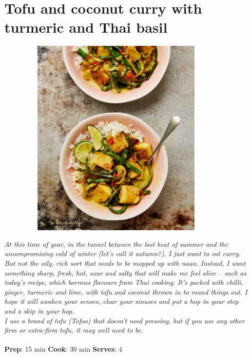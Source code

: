 \documentclass{book}
\begin{document}
\section{Tofu and coconut curry with turmeric and Thai basil}
\begin{figure}
\centering\includegraphics[width=10cm,height=10cm,keepaspectratio]{Recipe_Pictures/Tofu_and_coconut_curry_with_turmeric_and_Thai_basil.png}
\end{figure}
\emph{At this time of year, in the tunnel between the last heat of summer and the uncompromising cold of winter (let’s call it autumn?), I just want to eat curry. But not the oily, rich sort that needs to be mopped up with naan. Instead, I want something sharp, fresh, hot, sour and salty that will make me feel alive – such as today’s recipe, which borrows flavours from Thai cooking. It’s packed with chilli, ginger, turmeric and lime, with tofu and coconut thrown in to round things out. I hope it will awaken your senses, clear your sinuses and put a hop in your step and a skip in your hop.\\ 
I use a brand of tofu (Tofoo) that doesn’t need pressing, but if you use any other firm or extra-firm tofu, it may well need to be.}\\\\ 
\textbf{Prep}: 15 min
\textbf{Cook}: 30 min
\textbf{Serves}: 4
\end{document}
